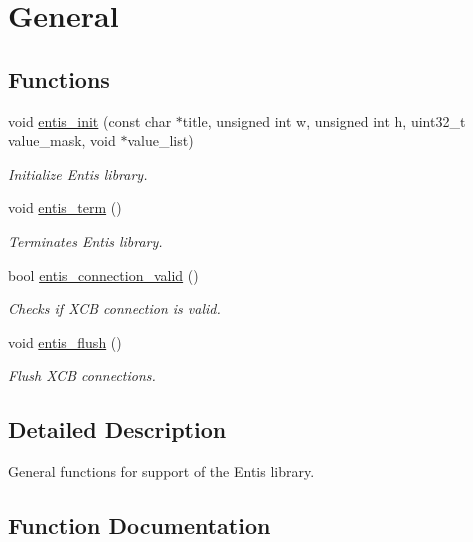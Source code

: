 \hypertarget{group__General}{}\section{General}
\label{group__General}
\subsection*{Functions}
\begin{DoxyCompactItemize}
\item 
void \hyperlink{group__General_ga9b2e862fe151d11a2f6564ff7c15688d}{entis\+\_\+init} (const char $\ast$title, unsigned int w, unsigned int h, uint32\+\_\+t value\+\_\+mask, void $\ast$value\+\_\+list)
\begin{DoxyCompactList}\small\item\em Initialize Entis library. \end{DoxyCompactList}\item 
void \hyperlink{group__General_ga12caa53e65fc497a009e460fff977b1c}{entis\+\_\+term} ()
\begin{DoxyCompactList}\small\item\em Terminates Entis library. \end{DoxyCompactList}\item 
bool \hyperlink{group__General_gada26de3271ef1aef670de8db756dea20}{entis\+\_\+connection\+\_\+valid} ()
\begin{DoxyCompactList}\small\item\em Checks if X\+CB connection is valid. \end{DoxyCompactList}\item 
void \hyperlink{group__General_gaae109a468964f275fa2deebd567b9aba}{entis\+\_\+flush} ()
\begin{DoxyCompactList}\small\item\em Flush X\+CB connections. \end{DoxyCompactList}\end{DoxyCompactItemize}


\subsection{Detailed Description}
General functions for support of the Entis library. 

\subsection{Function Documentation}
\mbox{\label{group__General_gada26de3271ef1aef670de8db756dea20}} 
